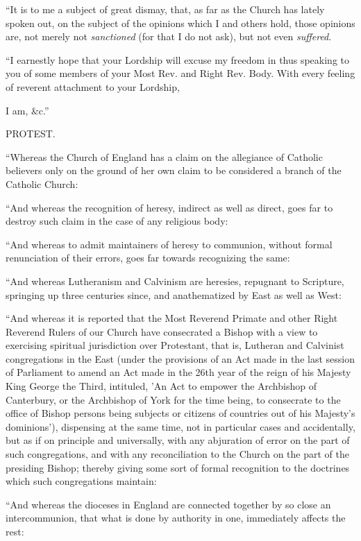 ``It is to me a subject of great dismay, that, as far as the Church has
lately spoken out, on the subject of the opinions which I and others
hold, those opinions are, not merely not \emph{sanctioned} (for that I
do not ask), but not even \emph{suffered}.

``I earnestly hope that your Lordship will excuse my freedom in
thus speaking to you of some members of your Most Rev. and Right Rev.
Body. With every feeling of reverent attachment to your Lordship,

I am, \&c.''

PROTEST.

``Whereas the Church of England has a claim on the allegiance of
Catholic believers only on the ground of her own claim to be considered
a branch of the Catholic Church:

``And whereas the recognition of heresy, indirect as well as
direct, goes far to destroy such claim in the case of any religious body:

``And whereas to admit maintainers of heresy to communion,
without formal renunciation of their errors, goes far towards
recognizing the same:

``And whereas Lutheranism and Calvinism are heresies, repugnant
to Scripture, springing up three centuries since, and anathematized by
East as well as West:

``And whereas it is reported that the Most Reverend Primate and
other Right Reverend Rulers of our Church have consecrated a Bishop with
a view to exercising spiritual jurisdiction over Protestant, that is,
Lutheran and Calvinist congregations in the East (under the provisions
of an Act made in the last session of Parliament to amend an Act made in
the 26th year of the reign of his Majesty King George the Third,
intituled, 'An Act to empower the Archbishop of Canterbury, or the
Archbishop of York for the time being, to consecrate to the office of
Bishop persons being subjects or citizens of countries out of his
Majesty's dominions'), dispensing at the same time, not in particular
cases and accidentally, but as if on principle and universally, with any
abjuration of error on the part of such congregations, and with any
reconciliation to the Church on the part of the presiding Bishop;
thereby giving some sort of formal recognition to the doctrines which
such congregations maintain:

``And whereas the dioceses in England are connected together by
so close an intercommunion, that what is done by authority in one,
immediately affects the rest:

